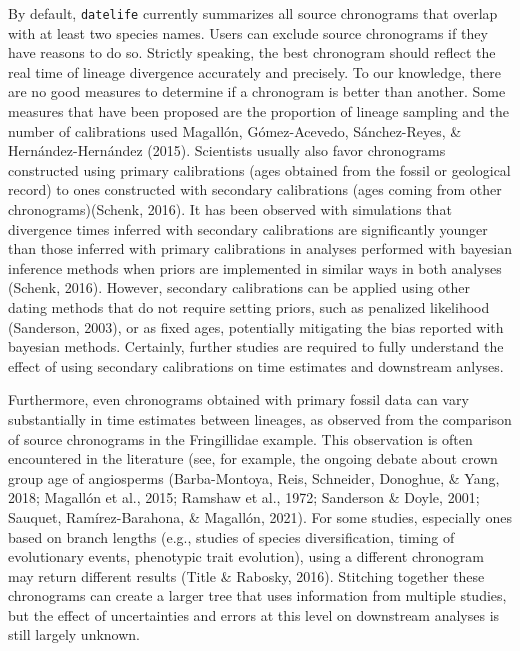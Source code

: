 \documentclass[
  english,
  man]{apa6}
\begin{document}
By default, \texttt{datelife} currently summarizes all source chronograms that overlap with at least two species names. Users can exclude source chronograms if they have reasons to do so. Strictly speaking, the best chronogram should reflect the real time of lineage divergence accurately and precisely. To our knowledge, there are no good measures to determine if a chronogram is better than another. Some measures that have been proposed are the proportion of lineage sampling and the number of calibrations used Magallón, Gómez-Acevedo, Sánchez-Reyes, \& Hernández-Hernández (2015). Scientists usually also favor chronograms constructed using primary calibrations (ages obtained from the fossil or geological record) to ones constructed with secondary calibrations (ages coming from other chronograms)(Schenk, 2016). It has been observed with simulations that divergence times inferred with secondary calibrations are significantly younger than those inferred with primary calibrations in analyses performed with bayesian inference methods when priors are implemented in similar ways in both analyses (Schenk, 2016). However, secondary calibrations
can be applied using other dating methods that do not require setting priors, such as penalized likelihood (Sanderson, 2003), or as fixed ages,
potentially mitigating the bias reported with bayesian methods. Certainly, further studies are required to fully understand the effect of using secondary calibrations on time estimates and downstream anlyses.

Furthermore, even chronograms obtained with primary fossil data can vary substantially in time estimates between lineages, as observed from the comparison of source chronograms in the Fringillidae example.
This observation is often encountered in the literature
(see, for example, the ongoing debate about crown group age of angiosperms (Barba-Montoya, Reis, Schneider, Donoghue, \& Yang, 2018; Magallón et al., 2015; Ramshaw et al., 1972; Sanderson \& Doyle, 2001; Sauquet, Ramírez-Barahona, \& Magallón, 2021). For some studies, especially ones based on branch lengths (e.g., studies of species diversification, timing of evolutionary events, phenotypic trait evolution), using a different chronogram may return different results (Title \& Rabosky, 2016). Stitching together these chronograms can create a larger tree that uses information from multiple studies, but the effect of uncertainties and errors at this level on downstream analyses is still largely unknown.
\end{document}
